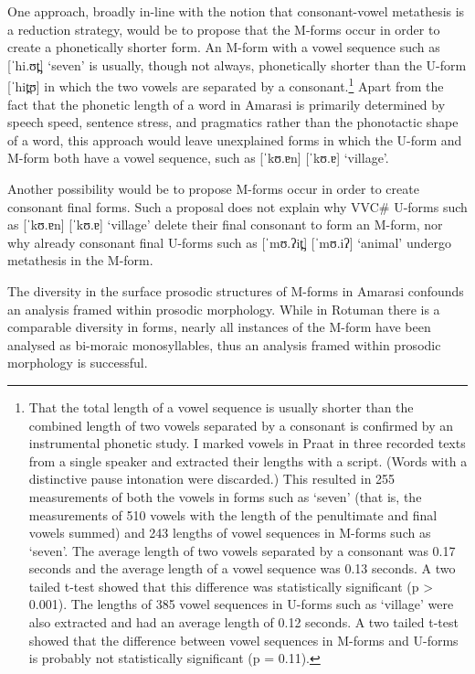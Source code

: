 One approach, broadly in-line with the 
notion that consonant-vowel metathesis is a reduction strategy,
would be to propose that the M-forms occur in order
to create a phonetically shorter form.
An M-form with a vowel sequence such as  [ˈhi.ʊt̪] `seven'
is usually, though not always, phonetically shorter than the U-form  [ˈhit̪ʊ]
in which the two vowels are separated by a consonant.\footnote{
		That the total length of a vowel sequence is usually shorter
		than the combined length of two vowels separated by a consonant
		is confirmed by an instrumental phonetic study.
		I marked vowels in Praat in three recorded texts from a single speaker
		and extracted their lengths with a script.
		(Words with a distinctive pause intonation were discarded.)
		This resulted in 255 measurements of both the vowels in forms such as  `seven'
		(that is, the measurements of 510 vowels with the length
		of the penultimate and final vowels summed)
		and 243 lengths of vowel sequences in M-forms such as  `seven'.
		The average length of two vowels separated by a consonant was 0.17 seconds
		and the average length of a vowel sequence was 0.13 seconds.
		A two tailed t-test showed that this difference was statistically significant (p > 0.001).
		The lengths of 385 vowel sequences in U-forms such as  `village'
		were also extracted and had an average length of 0.12 seconds.
		A two tailed t-test showed that the difference between vowel sequences
		in M-forms and U-forms is probably not statistically significant (p = 0.11).}
Apart from the fact that the phonetic length of a word in Amarasi
is primarily determined by speech speed, sentence stress, and pragmatics
rather than the phonotactic shape of a word,
this approach would leave unexplained forms in which the U-form
and M-form both have a vowel sequence, such as  [ˈkʊ.ɐn] {\ra}  [ˈkʊ.ɐ] `village'.

Another possibility would be to propose M-forms
occur in order to create consonant final forms.
Such a proposal does not explain why VVC{\#} U-forms
such as   [ˈkʊ.ɐn] {\ra}  [ˈkʊ.ɐ] `village' delete their final consonant
to form an M-form, nor why already consonant final U-forms
such as  [ˈmʊ.ʔit̪] {\ra}  [ˈmʊ.iʔ] `animal'
undergo metathesis in the M-form.

The diversity in the surface prosodic structures of M-forms in Amarasi
confounds an analysis framed within prosodic morphology.
While in Rotuman there is a comparable diversity in forms,
nearly all instances of the M-form
have been analysed as bi-moraic monosyllables,
thus an analysis framed within prosodic morphology is successful.

